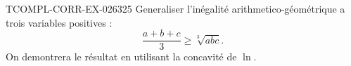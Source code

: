 \begin{exercice}{TCOMPL-CORR-EX-026}{3}{25}
Generaliser l'inégalité arithmetico-géométrique a trois variables positives :
\[ \frac{a+b+c}{3} \geq \sqrt[3]{abc}. \]
On demontrera le résultat en utilisant la concavité de $\ln$.

\end{exercice}
